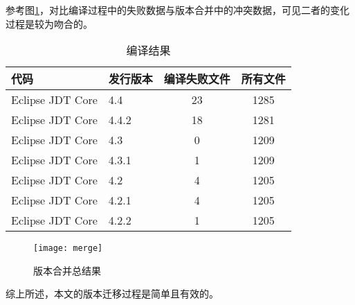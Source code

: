 参考图\ref {data_merge_compile}，对比编译过程中的失败数据与版本合并中的冲突数据，可见二者的变化过程是较为吻合的。

\begin{table}[H]
	\caption{编译结果}
	\label{data_git_merge2}
	\centering
	\begin{tabular}{llcc}
		\toprule[1.5pt]
		{\heiti 代码} & {\heiti 发行版本} & {\heiti 编译失败文件} & {\heiti 所有文件}\\\midrule[1pt]
		Eclipse JDT Core & 4.4 & 23 & 1285\\
		Eclipse JDT Core & 4.4.2 & 18 & 1281\\
		Eclipse JDT Core & 4.3 & 0 & 1209\\
		Eclipse JDT Core & 4.3.1 & 1 & 1209\\
		Eclipse JDT Core & 4.2 & 4 & 1205\\
		Eclipse JDT Core & 4.2.1 & 4 & 1205\\
		Eclipse JDT Core & 4.2.2 & 1 & 1205\\
		\bottomrule[1.5pt]
	\end{tabular}
\end{table}


\begin{figure}[H]
	\centering
	\texttt{[image: merge]}
	\caption {版本合并总结果}
	\label {data_merge_compile}	
\end{figure}



综上所述，本文的版本迁移过程是简单且有效的。

%
%


